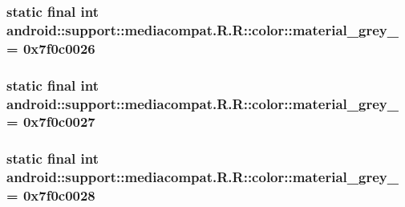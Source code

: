 \hypertarget{classandroid_1_1support_1_1mediacompat_1_1_r_1_1color_fbf65ae546c3e45c1dd7452aec1b3f7e}{
\subsubsection[{material\_\-grey\_\-50}]{\setlength{\rightskip}{0pt plus 5cm}static final int android::support::mediacompat.R.R::color::material\_\-grey\_ = 0x7f0c0026}}
\label{classandroid_1_1support_1_1mediacompat_1_1_r_1_1color_fbf65ae546c3e45c1dd7452aec1b3f7e}


\hypertarget{classandroid_1_1support_1_1mediacompat_1_1_r_1_1color_62bd8b7b822298a741e85c9d66edf5fd}{
\subsubsection[{material\_\-grey\_\-600}]{\setlength{\rightskip}{0pt plus 5cm}static final int android::support::mediacompat.R.R::color::material\_\-grey\_ = 0x7f0c0027}}
\label{classandroid_1_1support_1_1mediacompat_1_1_r_1_1color_62bd8b7b822298a741e85c9d66edf5fd}


\hypertarget{classandroid_1_1support_1_1mediacompat_1_1_r_1_1color_283260df848554bc065c4ede907a90d8}{
\subsubsection[{material\_\-grey\_\-800}]{\setlength{\rightskip}{0pt plus 5cm}static final int android::support::mediacompat.R.R::color::material\_\-grey\_ = 0x7f0c0028}}
\label{classandroid_1_1support_1_1mediacompat_1_1_r_1_1color_283260df848554bc065c4ede907a90d8}


